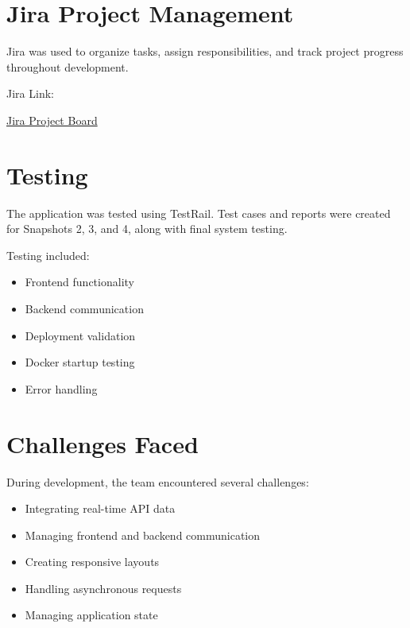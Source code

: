 \documentclass{article}
\begin{document}
\section{Jira Project Management}

Jira was used to organize tasks, assign responsibilities, and track project progress throughout development.

Jira Link:

\href{https://finalgroup1project.atlassian.net/jira/software/projects/KAN/boards/1?atlOrigin=eyJpIjoiYTMzMTdkZGI1ZTZmNGIxMDgxYWJjZjUzMzRmZmE5YmQiLCJwIjoiaiJ9}
{Jira Project Board}

\section{Testing}

The application was tested using TestRail. Test cases and reports were created for Snapshots 2, 3, and 4, along with final system testing.

Testing included:

\begin{itemize}[leftmargin=*]
    \item Frontend functionality
    \item Backend communication
    \item Deployment validation
    \item Docker startup testing
    \item Error handling
\end{itemize}

\section{Challenges Faced}

During development, the team encountered several challenges:

\begin{itemize}[leftmargin=*]
    \item Integrating real-time API data
    \item Managing frontend and backend communication
    \item Creating responsive layouts
    \item Handling asynchronous requests
    \item Managing application state
\end{itemize}
\end{document}
